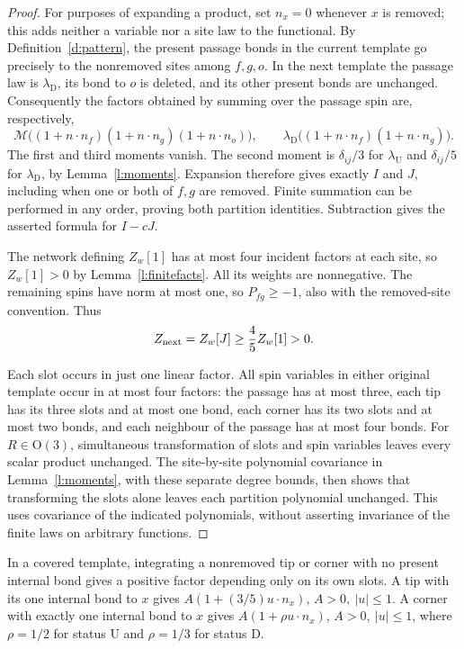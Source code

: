 \begin{proof}
For purposes of expanding a product, set \(n_x=0\) whenever \(x\)
is removed; this adds neither a variable nor a site law to the
functional.  By Definition~\ref{d:pattern}, the present passage
bonds in the current template go precisely to the nonremoved sites
among \(f,g,o\).  In the next template the passage law is
\(\lambda_{\mathrm D}\), its bond to \(o\) is deleted, and its
other present bonds are unchanged.  Consequently the factors
obtained by summing over the passage spin are, respectively,
\[
 \mathcal M\bigl((1+n\cdot n_f)(1+n\cdot n_g)
                         (1+n\cdot n_o)\bigr),\qquad
 \lambda_{\mathrm D}\bigl((1+n\cdot n_f)(1+n\cdot n_g)\bigr).
\]
The first and third moments vanish.  The second moment is
\(\delta_{ij}/3\) for \(\lambda_{\mathrm U}\) and
\(\delta_{ij}/5\) for \(\lambda_{\mathrm D}\), by
Lemma~\ref{l:moments}.  Expansion therefore gives exactly \(I\)
and \(J\), including when one or both of \(f,g\) are removed.
Finite summation can be performed in any order, proving both
partition identities.  Subtraction gives the asserted formula for
\(I-cJ\).

The network defining \(Z_w[1]\) has at most four incident factors
at each site, so \(Z_w[1]>0\) by Lemma~\ref{l:finitefacts}.
All its weights are nonnegative.  The remaining spins have norm
at most one, so \(P_{fg}\ge-1\), also with the removed-site
convention.  Thus
\[
 Z_{\rm next}=Z_w[J]\ge\frac45 Z_w[1]>0.
\]

Each slot occurs in just one linear factor.  All spin variables
in either original template occur in at most four factors:
the passage has at most three, each tip has its three slots and
at most one bond, each corner has its two slots and at most two
bonds, and each neighbour of the passage has at most four bonds.
For \(R\in\mathrm O(3)\), simultaneous transformation of slots
and spin variables leaves every scalar product unchanged.
The site-by-site polynomial covariance in
Lemma~\ref{l:moments}, with these separate degree bounds, then
shows that transforming the slots alone leaves each partition
polynomial unchanged.  This uses covariance of the indicated
polynomials, without asserting invariance of the finite laws on
arbitrary functions.
\end{proof}

\begin{lemma}\label{l:leaf}
In a covered template, integrating a nonremoved tip or corner
with no present internal bond gives a positive factor depending
only on its own slots.
A tip with its one internal bond to \(x\) gives
\(A(1+(3/5)u\cdot n_x)\), \(A>0,\ |u|\le1\).
A corner with exactly one internal bond to \(x\) gives
\(A(1+\rho u\cdot n_x)\), \(A>0,\ |u|\le1\), where
\(\rho=1/2\) for status \(\mathrm U\) and \(\rho=1/3\)
for status \(\mathrm D\).
\end{lemma}

